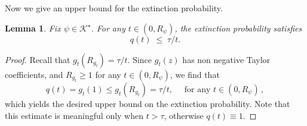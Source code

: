 \documentclass[11pt,a4paper,leqno]{amsart}
\theoremstyle{plain}
\newtheorem{lem}[theo]{Lemma}
\theoremstyle{definition}
\numberwithin{equation}{section}
\def\K{\mathcal{K}}
\begin{document}
	Now we give an upper bound for the extinction probability. 
	\begin{lem}\label{lemma: bound_q} Fix $\psi \in \K^{\star}$. For any \(t\in(0,R_\psi)\), the extinction probability satisfies
		\[
		q(t)\;\le\;{\tau}/{t}.
		\]
	\end{lem}
	\begin{proof}
		Recall that $g_t(R_{g_t}) = \tau/t$. Since $g_t(z)$ has non negative Taylor coefficients, and $R_{g_t} \geq 1$ for any $t \in (0,R_{\psi})$, we find that 
		$$q(t) = g_t(1) \leq g_t(R_{g_t}) = \tau/t, \quad \text{ for any } t \in (0,R_{\psi})\,,$$ 
		which yields the desired upper bound on the extinction probability. Note that this estimate is meaningful only when $t > \tau$, otherwise $q(t) \equiv 1$. 
	\end{proof}
	
\end{document}
